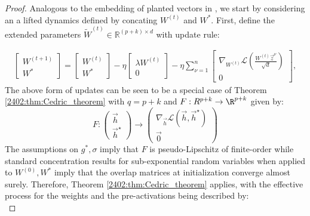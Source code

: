 \begin{proof}
  Analogous to the embedding of planted vectors in \citep{celentano2021high}, we start by considering an a lifted dynamics defined by concating $W^{(t)}$ and $W^*$. First, define the extended parameters ${\tilde W}^{(t)}\in \mathbb{R}^{(p+k)\times d}$ with update rule:
    
    \begin{align} \label{2402:eq:combined_GD}
        \begin{bmatrix} W^{(t+1)} \\ W^* \end{bmatrix} = \begin{bmatrix} W^{(t)} \\ W^* \end{bmatrix} -\eta \begin{bmatrix} \lambda W^{(t)} \\ 0 \end{bmatrix} - \eta \sum_{\nu=1}^n\begin{bmatrix}
            \nabla_{W^{(t)}}  \mathcal{L}\left(\frac{W^{(t)}\vec z^\nu} {\sqrt{d}}\right) \\0
        \end{bmatrix} ,
    \end{align}
   The above form of updates can be seen to be a special case of Theorem \ref{2402:thm:Cedric_theorem} with $q=p+k$ and $F: R^{p+k} \rightarrow \R^{p+k}$ given by:
   \begin{equation}
       F: \begin{pmatrix}
           \vec{h}\\
           \vec{h}^\star
       \end{pmatrix} \rightarrow 
       \begin{pmatrix}\nabla_{\vec{h}}\mathcal{L}(\vec{h},\vec{h}^\star) \\
       \vec{0}
        \end{pmatrix}
   \end{equation}
The assumptions on $g^*, \sigma$ imply that $F$ is pseudo-Lipschitz of finite-order while standard concentration results for sub-exponential random variables when applied to $W^{(0)},W^{*}$ imply that the overlap matrices at initialization converge almost surely. Therefore, Theorem \ref{2402:thm:Cedric_theorem} applies, with the effective process for the weights and the pre-activations being described by: 
    \begin{equation} \label{2402:eq:combined_theta}

\end{equation}
\end{proof}
